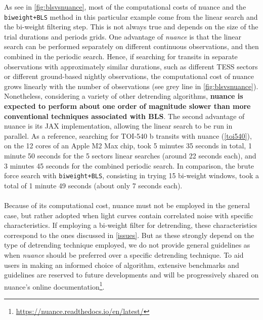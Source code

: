 \documentclass[modern]{aastex631}
\newcommand{\nuancemethod}{\textit{nuance}}
\newcommand{\nuancecode}{\textsf{nuance}}
\newcommand{\footlink}[1]{\footnote{\url{#1}}}
\begin{document}
As see in \autoref{fig:blsvsnuance}, most of the computational costs of \nuancecode{} and the \texttt{biweight+BLS} method in this particular example come from the linear search and the bi-weight filtering step. This is not always true and depends on the size of the trial durations and periods grids. One advantage of \nuancemethod{} is that the linear search can be performed separately on different continuous observations, and then combined in the periodic search. Hence, if searching for transits in separate observations with approximately similar durations, such as different TESS sectors or different ground-based nightly observations, the computational cost of \nuancecode{} grows linearly with the number of observations (see grey line in \autoref{fig:blsvsnuance}). Nonetheless, considering a variety of other detrending algorithms, \textbf{\nuancecode{} is expected to perform about one order of magnitude slower than more conventional techniques associated with BLS}. The second advantage of \nuancecode{} is its \textsf{JAX} implementation, allowing the linear search to be run in parallel. As a reference, searching for TOI-540 b transits with nuance (\autoref{toi540}), on the 12 cores of an Apple M2 Max chip, took 5 minutes 35 seconds in total, 1 minute 50 seconds for the 5 sectors linear searches (around 22 seconds each), and 3 minutes 45 seconds for the combined periodic search. In comparison, the brute force search with \texttt{biweight+BLS}, consisting in trying 15 bi-weight windows, took a total of 1 minute 49 seconds (about only 7 seconds each).\\\\
Because of its computational cost, \nuancecode{} must not be employed in the general case, but rather adopted when light curves contain correlated noise with specific characteristics. If employing a bi-weight filter for detrending, these characteristics correspond to the ones discussed in \autoref{issues}. But as these strongly depend on the type of detrending technique employed, we do not provide general guidelines as when \nuancemethod{} should be preferred over a specific detrending technique. To aid users in making an informed choice of algorithm, extensive benchmarks and guidelines are reserved to future developments and will be progressively shared on \nuancecode{}'s online documentation\footlink{https://nuance.readthedocs.io/en/latest/}.
\end{document}
